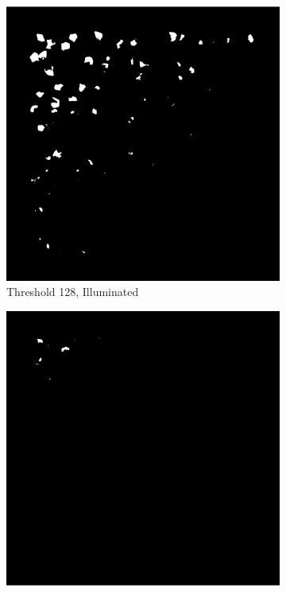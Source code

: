 \documentclass[%
	a4paper, %
	12pt, %
	english, %
	bibtotoc %
]{scrartcl}
\begin{document}
\begin{figure}[H]
    \begin{subfigure}{0.3\linewidth}
        \includegraphics[width=\linewidth]{latex-template-ss24/images/segmentation_128_threshold_illuminated.png}
        \caption{Threshold 128, Illuminated}
        \label{fig:segmentation_128_threshold_illuminated}
    \end{subfigure}
    \begin{subfigure}{0.3\linewidth}
        \includegraphics[width=\linewidth]{latex-template-ss24/images/segmentation_200_threshold_illuminated.png}

\end{subfigure}
\end{figure}
\end{document}
